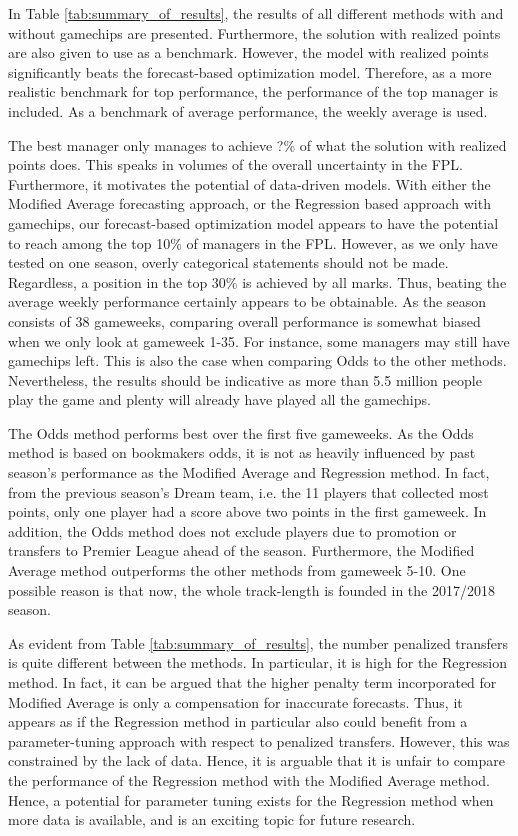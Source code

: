 In Table \ref{tab:summary_of_results}, the results of all different methods with and without gamechips are presented. Furthermore, the solution with realized points are also given to use as a benchmark. However, the model with realized points significantly beats the forecast-based optimization model. Therefore, as a more realistic benchmark for top performance, the performance of the top manager is included. As a benchmark of average performance, the weekly average is used.

\newpar

The best manager only manages to achieve ?\% of what the solution with realized points does. This speaks in volumes of the overall uncertainty in the FPL. Furthermore, it motivates the potential of data-driven models. With either the Modified Average forecasting approach, or the Regression based approach with gamechips, our forecast-based optimization model appears to have the potential to reach among the top 10\% of managers in the FPL. However, as we only have tested on one season, overly categorical statements should not be made. Regardless, a position in the top 30\% is achieved by all marks. Thus, beating the average weekly performance certainly appears to be obtainable. As the season consists of 38 gameweeks, comparing overall performance is somewhat biased when we only look at gameweek 1-35. For instance, some managers may still have gamechips left. This is also the case when comparing Odds to the other methods. Nevertheless, the results should be indicative as more than 5.5 million people play the game and plenty will already have played all the gamechips.

\newpar

The Odds method performs best over the first five gameweeks. As the Odds method is based on bookmakers odds, it is not as heavily influenced by past season's performance as the Modified Average and Regression method. In fact, from the previous season's Dream team, i.e. the 11 players that collected most points, only one player had a score above two points in the first gameweek. In addition, the Odds method does not exclude players due to promotion or transfers to Premier League ahead of the season. Furthermore, the Modified Average method outperforms the other methods from gameweek 5-10. One possible reason is that now, the whole track-length is founded in the 2017/2018 season.

\newpar

As evident from Table \ref{tab:summary_of_results}, the number penalized transfers is quite different between the methods. In particular, it is high for the Regression method. In fact, it can be argued that the higher penalty term incorporated for Modified Average is only a compensation for inaccurate forecasts. Thus, it appears as if the Regression method in particular also could benefit from a parameter-tuning approach with respect to penalized transfers. However, this was constrained by the lack of data. Hence, it is arguable that it is unfair to compare the performance of the Regression method with the Modified Average method. Hence, a potential for parameter tuning exists for the Regression method when more data is available, and is an exciting topic for future research.

